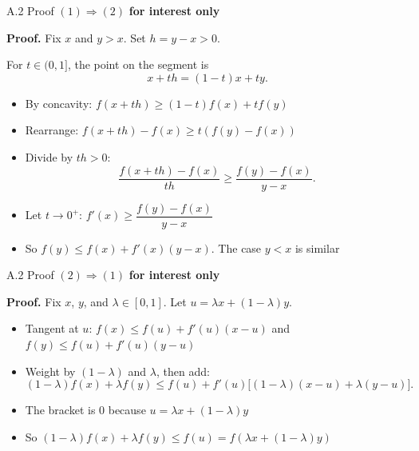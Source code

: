 \documentclass[11pt,aspectratio=169]{beamer}
\newcommand{\InterestOnly}{\textcolor{mAccent}{\textbf{for interest only}}}
\begin{document}
\hypertarget{appendix:concave_12}{}
\begin{frame}{A.2 Proof $(1) \Rightarrow (2)$}
  \small
  \InterestOnly
  
  \textbf{Proof.} Fix $x$ and $y > x$. Set $h = y - x > 0$.
  
  For $t \in (0,1]$, the point on the segment is
  \[
    x + th = (1-t)x + ty.
  \]
  
  \begin{itemize}
    \item By concavity: $f(x+th) \geq (1-t)f(x) + tf(y)$
    
    \item Rearrange: $f(x+th) - f(x) \geq t(f(y)-f(x))$
    
    \item Divide by $th > 0$:
    \[
      \frac{f(x+th)-f(x)}{th} \geq \frac{f(y)-f(x)}{y-x}.
    \]
    
    \item Let $t \to 0^+$: $f'(x) \geq \dfrac{f(y)-f(x)}{y-x}$
    
    \item So $f(y) \leq f(x) + f'(x)(y-x)$. The case $y < x$ is similar
  \end{itemize}
\end{frame}

\begin{frame}{A.2 Proof $(2) \Rightarrow (1)$}
  \small
  \InterestOnly
  
  \textbf{Proof.} Fix $x$, $y$, and $\lambda \in [0,1]$. Let $u=\lambda x+(1-\lambda)y$.
  
  \begin{itemize}
    \item Tangent at $u$: $f(x) \leq f(u)+f'(u)(x-u)$ and $f(y) \leq f(u)+f'(u)(y-u)$
    
    \item Weight by $(1-\lambda)$ and $\lambda$, then add:
    \[
      (1-\lambda)f(x)+\lambda f(y)
      \leq f(u) + f'(u)\big[(1-\lambda)(x-u)+\lambda(y-u)\big].
    \]
    
    \item The bracket is $0$ because $u=\lambda x+(1-\lambda)y$
    
    \item So $(1-\lambda)f(x)+\lambda f(y) \leq f(u)=f(\lambda x+(1-\lambda)y)$
  \end{itemize}
\end{frame}
\end{document}
